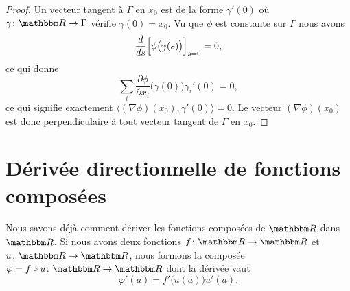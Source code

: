 \begin{proof}
    Un vecteur tangent à \( \Gamma\) en \( x_0\) est de la forme \( \gamma'(0)\) où \( \gamma\colon \eR \to \Gamma\) vérifie \( \gamma(0)=x_0\). Vu que \( \phi\) est constante sur \( \Gamma\) nous avons
    \begin{equation}
        \frac{d}{ds}\Big[ \phi\big( \gamma(s) \big) \Big]_{s=0}=0,
    \end{equation}
    ce qui donne
    \begin{equation}
        \sum_i\frac{ \partial \phi }{ \partial x_i }\big( \gamma(0) \big)\gamma_i'(0)=0,
    \end{equation}
    ce qui signifie exactement \( \langle (\nabla\phi)(x_0), \gamma'(0)\rangle=0\). Le vecteur \( (\nabla\phi)(x_0)\) est donc perpendiculaire à tout vecteur tangent de \( \Gamma\) en \( x_0\).
\end{proof}

\section{Dérivée directionnelle de fonctions composées}		\label{SecDerDirFnComp}

Nous savons déjà comment dériver les fonctions composées de $\eR$ dans $\eR$. Si nous avons deux fonctions $f\colon \eR\to \eR$ et $u\colon \eR\to \eR$, nous formons la composée $\varphi=f\circ u\colon \eR\to \eR$ dont la dérivée vaut
\begin{equation}
	\varphi'(a)=f'\big( u(a) \big)u'(a).
\end{equation}

